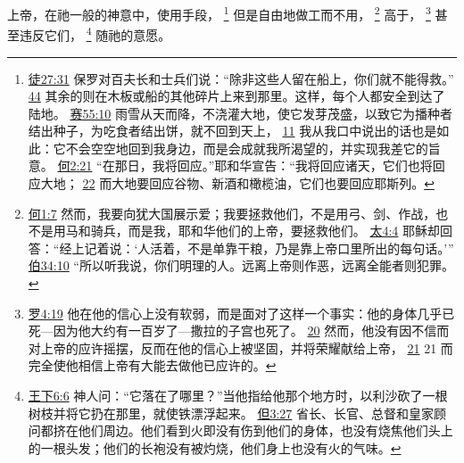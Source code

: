 \documentclass[12pt, a4paper, oneside]{ctexart}
\newcounter{parnum}[section]
\newcommand{\N}{%
   \noindent\refstepcounter{parnum}%
    \makebox[\parindent][l]{\textbf{\arabic{parnum}.}}}
\begin{document}
\N 上帝，在祂一般的神意中，使用手段，
	\footnote {
		\href{https://biblehub.com/acts/27-31.htm}{徒27:31} 保罗对百夫长和士兵们说：“除非这些人留在船上，你们就不能得救。”
		\href{https://biblehub.com/acts/27-44.htm}{44} 其余的则在木板或船的其他碎片上来到那里。这样，每个人都安全到达了陆地。
		\href{https://biblehub.com/isaiah/55-10.htm}{赛55:10} 雨雪从天而降，不浇灌大地，使它发芽茂盛，以致它为播种者结出种子，为吃食者结出饼，就不回到天上，
		\href{https://biblehub.com/isaiah/55-11.htm}{11} 我从我口中说出的话也是如此：它不会空空地回到我身边，而是会成就我所渴望的，并实现我差它的旨意。
		\href{https://biblehub.com/hosea/2-21.htm}{何2:21} “在那日，我将回应。”耶和华宣告：“我将回应诸天，它们也将回应大地；
		\href{https://biblehub.com/hosea/2-22.htm}{22} 而大地要回应谷物、新酒和橄榄油，它们也要回应耶斯列。
	}
	但是自由地做工而不用，
	\footnote {
		\href{https://biblehub.com/hosea/1-7.htm}{何1:7} 然而，我要向犹大国展示爱；我要拯救他们，不是用弓、剑、作战，也不是用马和骑兵，而是我，耶和华他们的上帝，要拯救他们。
		\href{https://biblehub.com/matthew/4-4.htm}{太4:4} 耶稣却回答：“经上记着说：‘人活着，不是单靠干粮，乃是靠上帝口里所出的每句话。’” 
		\href{https://biblehub.com/job/34-10.htm}{伯34:10} “所以听我说，你们明理的人。远离上帝则作恶，远离全能者则犯罪。	
	}
	高于，
	\footnote {
		\href{https://biblehub.com/romans/4-19.htm}{罗4:19} 他在他的信心上没有软弱，而是面对了这样一个事实：他的身体几乎已死---因为他大约有一百岁了---撒拉的子宫也死了。
		\href{https://biblehub.com/romans/4-20.htm}{20} 然而，他没有因不信而对上帝的应许摇摆，反而在他的信心上被坚固，并将荣耀献给上帝，
		\href{https://biblehub.com/romans/4-21.htm}{21} 21 而完全使他相信上帝有大能去做他已应许的。
	}
	甚至违反它们，
	\footnote {
		\href{https://biblehub.com/2_kings/6-6.htm}{王下6:6} 神人问：“它落在了哪里？”当他指给他那个地方时，以利沙砍了一根树枝并将它扔在那里，就使铁漂浮起来。
		\href{https://biblehub.com/daniel/3-27.htm}{但3:27} 省长、长官、总督和皇家顾问都挤在他们周边。他们看到火即没有伤到他们的身体，也没有烧焦他们头上的一根头发；他们的长袍没有被灼烧，他们身上也没有火的气味。
	}
	随祂的意愿。
\end{document}
